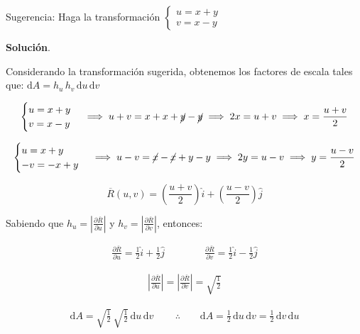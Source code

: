 \documentclass[12pt]{article}
\begin{document}
\vspace{3mm}

\noindent Sugerencia: Haga la transformación $\begin{cases} u = x+y\\v=x-y\end{cases}$

\noindent \textbf{Solución}.

\vspace{3mm}

\noindent Considerando la transformación sugerida, obtenemos los factores de escala tales que: $\mathrm{d}A = h_u\,h_v\,\mathrm{d}u\,\mathrm{d}v$

\begin{align*}
	\begin{cases}
		u = x+y\\
		v=x-y
	\end{cases} \implies u+v=x+x+\cancel{y}-\cancel{y} \implies 2x = u+v \implies x = \frac{u+v}{2}
\end{align*}

\begin{align*}
	\begin{cases}
		u = x+y\\
		-v = -x+y
	\end{cases} \implies u-v=\cancel{x}-\cancel{x}+y-y \implies 2y = u-v \implies y = \frac{u-v}{2}
\end{align*}

\begin{equation}\label{eqn:9-1}\tag{1}
	\overline{R}(u,v)=\left(\frac{u+v}{2}\right)\hat{i} + (\frac{u-v}{2})\hat{j}
\end{equation}

\noindent Sabiendo que $h_u = |\frac{\partial \overline{R}}{\partial u}|$ y $h_v = |\frac{\partial \overline{R}}{\partial v}|$, entonces:

\begin{align*}
	\frac{\partial \overline{R}}{\partial u} = \frac{1}{2}\hat{i} + \frac{1}{2}\hat{j} \qquad \qquad
	\frac{\partial \overline{R}}{\partial v} = \frac{1}{2}\hat{i} - \frac{1}{2}\hat{j}
\end{align*}

\begin{align*}
	\left|\frac{\partial \overline{R}}{\partial u}\right| = \left|\frac{\partial \overline{R}}{\partial v}\right| = \sqrt{\frac{1}{2}}
\end{align*}

\begin{align*}
	\mathrm{d}A = \sqrt{\frac{1}{2}}\,\sqrt{\frac{1}{2}}\, \mathrm{d}u\,\mathrm{d}v\, \qquad \therefore \qquad \mathrm{d}A = \frac{1}{2}\,\mathrm{d}u\,\mathrm{d}v = \frac{1}{2}\,\mathrm{d}v\,\mathrm{d}u
\end{align*}
\end{document}
